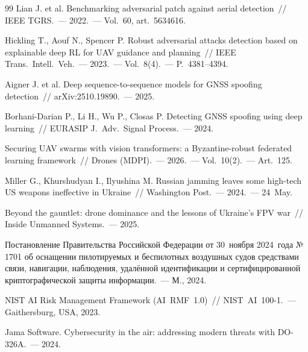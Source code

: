 \begin{thebibliography}{99}
Lian J. et al. Benchmarking adversarial patch against aerial
detection~// IEEE TGRS.~--- 2022.~--- Vol.~60, art.~5634616.

Hickling T., Aouf N., Spencer P. Robust adversarial attacks detection
based on explainable deep RL for UAV guidance and planning~//
IEEE Trans.~Intell.~Veh.~--- 2023.~--- Vol.~8(4).~--- P.~4381--4394.

Aigner J. et al. Deep sequence-to-sequence models for GNSS spoofing
detection~// arXiv:2510.19890.~--- 2025.

Borhani-Darian P., Li H., Wu P., Closas P. Detecting GNSS spoofing
using deep learning~// EURASIP J.~Adv.~Signal Process.~--- 2024.

Securing UAV swarms with vision transformers: a Byzantine-robust
federated learning framework~// Drones (MDPI).~--- 2026.~---
Vol.~10(2).~--- Art.~125.

Miller G., Khurshudyan I., Ilyushina M. Russian jamming leaves some
high-tech US weapons ineffective in Ukraine~// Washington Post.~---
2024.~--- 24~May.

Beyond the gauntlet: drone dominance and the lessons of Ukraine's FPV
war~// Inside Unmanned Systems.~--- 2025.

Постановление Правительства Российской Федерации от 30~ноября
2024~года №\,1701 об оснащении пилотируемых и беспилотных воздушных
судов средствами связи, навигации, наблюдения, удалённой
идентификации и сертифицированной криптографической защиты
информации.~--- М., 2024.

NIST AI Risk Management Framework (AI~RMF~1.0)~// NIST~AI~100-1.~---
Gaithersburg, USA, 2023.

Jama Software. Cybersecurity in the air: addressing modern threats
with DO-326A.~--- 2024.
\end{thebibliography}

